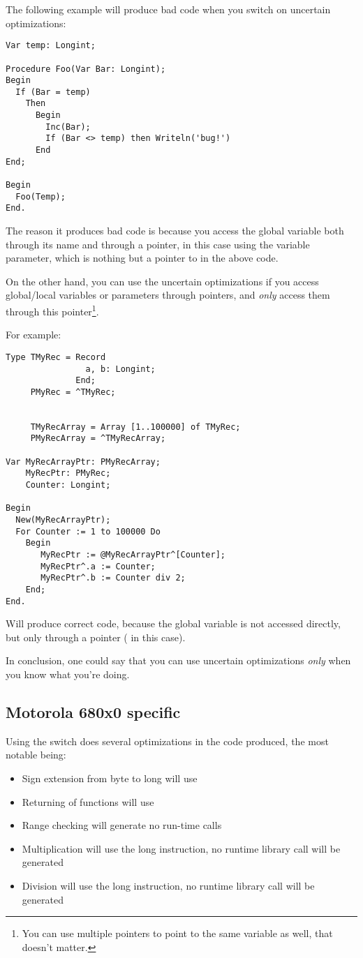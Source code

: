 \begin{enumerate}
The following example will produce bad code when you switch on
uncertain optimizations:
\begin{verbatim}
Var temp: Longint;

Procedure Foo(Var Bar: Longint);
Begin
  If (Bar = temp)
    Then
      Begin
        Inc(Bar);
        If (Bar <> temp) then Writeln('bug!')
      End
End;

Begin
  Foo(Temp);
End.
\end{verbatim}
The reason it produces bad code is because you access the global variable
 both through its name  and through a pointer, in this
case using the  variable parameter, which is nothing but a pointer
to  in the above code.

On the other hand, you can use the uncertain optimizations if
you access global/local variables or parameters through pointers,
and {\em only} access them through this pointer\footnote{
You can use multiple pointers to point to the same variable as well, that
doesn't matter.}.

For example:
\begin{verbatim}
Type TMyRec = Record
                a, b: Longint;
              End;
     PMyRec = ^TMyRec;


     TMyRecArray = Array [1..100000] of TMyRec;
     PMyRecArray = ^TMyRecArray;

Var MyRecArrayPtr: PMyRecArray;
    MyRecPtr: PMyRec;
    Counter: Longint;

Begin
  New(MyRecArrayPtr);
  For Counter := 1 to 100000 Do
    Begin
       MyRecPtr := @MyRecArrayPtr^[Counter];
       MyRecPtr^.a := Counter;
       MyRecPtr^.b := Counter div 2;
    End;
End.
\end{verbatim}
Will produce correct code, because the global variable 
is not accessed directly, but only through a pointer ( in this
case).

In conclusion, one could say that you can use uncertain optimizations {\em
only} when you know what you're doing.
\end{enumerate}

\subsection{Motorola 680x0 specific}

Using the  switch does several optimizations in the
code produced, the most notable being:

\begin{itemize}
\item Sign extension from byte to long will use 
\item Returning of functions will use 
\item Range checking will generate no run-time calls
\item Multiplication will use the long  instruction, no
runtime library call will be generated
\item Division will use the long  instruction, no
runtime library call will be generated
\end{itemize}

